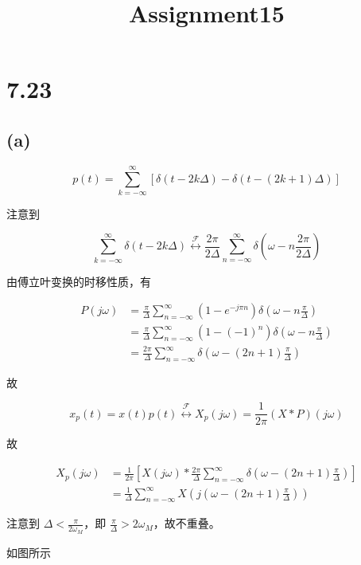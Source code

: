 \documentclass[11pt]{article}
\title{Assignment15}
\begin{document}
    
    \maketitle
    
    

    
    \section{7.23}\label{section}

\subsection{(a)}\label{a}

\[
p(t) = \sum\limits_{k = -\infty}^\infty [\delta(t - 2k\Delta) - \delta(t - (2k+1)\Delta)]
\]

注意到

\[
\sum_{k = -\infty}^\infty \delta(t - 2k\Delta) \stackrel{\mathcal F}{\longleftrightarrow} \frac{2\pi}{2\Delta}\sum_{n = -\infty}^\infty \delta(\omega - n\frac{2\pi}{2\Delta})
\]

由傅立叶变换的时移性质，有

\[
\begin{aligned}
P(j\omega) &= \frac{\pi}{\Delta} \sum_{n = -\infty}^\infty (1 - e^{-j\pi n})\delta(\omega - n\frac{\pi}{\Delta}) \\
&=\frac{\pi}{\Delta}\sum_{n = -\infty}^\infty (1 - (-1)^n)\delta(\omega - n\frac{\pi}{\Delta}) \\
&= \frac{2\pi}{\Delta}\sum_{n = -\infty}^\infty \delta(\omega - (2n+1)\frac{\pi}{\Delta})
\end{aligned}
\]

故

\[
x_p(t) = x(t)p(t) \stackrel{\mathcal{F}}{\longleftrightarrow} X_p(j\omega) = \frac{1}{2\pi}(X*P)(j\omega)
\]

故

\[
\begin{aligned}
X_p(j\omega) &= \frac{1}{2\pi}\left[X(j\omega) * \frac{2\pi}{\Delta}\sum_{n = -\infty}^\infty\delta(\omega - (2n+1)\frac{\pi}{\Delta})\right] \\
&= \frac{1}{\Delta}\sum_{n = -\infty}^\infty X(j(\omega - (2n + 1)\frac{\pi}{\Delta}))
\end{aligned}
\]

注意到 \(\Delta < \frac{\pi}{2\omega_M}\)，即
\(\frac{\pi}{\Delta} > 2\omega_M\)，故不重叠。

如图所示
\end{document}
